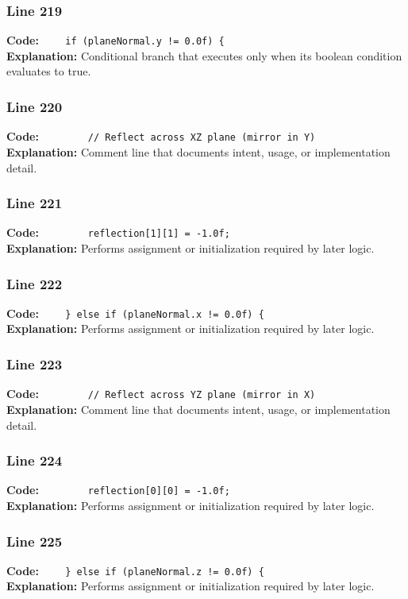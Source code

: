 \documentclass[11pt,a4paper]{article}
\begin{document}
\subsubsection*{Line 219}
\textbf{Code:} \verb|    if (planeNormal.y != 0.0f) {|\\
\textbf{Explanation:} Conditional branch that executes only when its boolean condition evaluates to true.

\subsubsection*{Line 220}
\textbf{Code:} \verb|        // Reflect across XZ plane (mirror in Y)|\\
\textbf{Explanation:} Comment line that documents intent, usage, or implementation detail.

\subsubsection*{Line 221}
\textbf{Code:} \verb|        reflection[1][1] = -1.0f;|\\
\textbf{Explanation:} Performs assignment or initialization required by later logic.

\subsubsection*{Line 222}
\textbf{Code:} \verb|    } else if (planeNormal.x != 0.0f) {|\\
\textbf{Explanation:} Performs assignment or initialization required by later logic.

\subsubsection*{Line 223}
\textbf{Code:} \verb|        // Reflect across YZ plane (mirror in X)|\\
\textbf{Explanation:} Comment line that documents intent, usage, or implementation detail.

\subsubsection*{Line 224}
\textbf{Code:} \verb|        reflection[0][0] = -1.0f;|\\
\textbf{Explanation:} Performs assignment or initialization required by later logic.

\subsubsection*{Line 225}
\textbf{Code:} \verb|    } else if (planeNormal.z != 0.0f) {|\\
\textbf{Explanation:} Performs assignment or initialization required by later logic.
\end{document}
